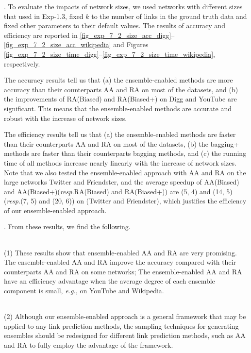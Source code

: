 \documentclass[10pt,journal,compsoc]{IEEEtran}
\newcommand{\stitle}[1]{\vspace{0.5ex}\noindent{\bf #1}}
\newcommand{\Aa}{{\sf AA}\xspace }
\newcommand{\RA}{{\sf RA}\xspace }
\newcommand{\Digg}{{\sf Digg}\xspace}
\newcommand{\YouTube}{{\sf YouTube}\xspace}
\newcommand{\Wikipedia}{{\sf Wikipedia}\xspace}
\newcommand{\Twitter}{{\sf Twitter}\xspace}
\newcommand{\Friendster}{{\sf Friendster}\xspace}
\newcommand{\AABiased}{{\sf AA(Biased)}\xspace}
\newcommand{\AABiasedp}{{\sf AA(Biased+)}\xspace}
\newcommand{\RABiased}{{\sf RA(Biased)}\xspace}
\newcommand{\RABiasedp}{{\sf RA(Biased+)}\xspace}
\newcommand{\eg}{\emph{e.g.,}\xspace}
\newcommand{\resp}{\emph{resp.}\xspace}
\newcommand{\sstab}{\rule{0pt}{8pt}\\[-2.4ex]}
\begin{document}
\stitle{Exp-7.2: Impacts of network sizes}. To evaluate the impacts of
network sizes, we used networks with different sizes that used in Exp-1.3,
fixed $k$ to the number of links in the ground truth data
and fixed other parameters to their default values.
The results of accuracy and  efficiency are reported in \ref{fig_exp_7_2_size_acc_digg}--\ref{fig_exp_7_2_size_acc_wikipedia}
and Figures \ref{fig_exp_7_2_size_time_digg}--\ref{fig_exp_7_2_size_time_wikipedia}, respectively.

The accuracy results tell us that (a) the ensemble-enabled methods are
more accuracy than their counterparts \Aa and \RA  on most of the datasets,
and (b) the improvements of \RABiased and \RABiasedp on \Digg and \YouTube are significant.
This means that the ensemble-enabled methods are accurate and robust
with the increase of network sizes.

The  efficiency  results tell us that (a) the ensemble-enabled methods are
faster than their counterparts \Aa and \RA  on most of the datasets,
(b) the bagging+ methods are faster than their counterparts bagging methods,
and (c) the running time of all methods increase nearly linearly with the
increase of network sizes. Note that we also tested the ensemble-enabled approach
with \Aa and \RA on the large networks \Twitter and \Friendster, and the average
speedup of \AABiased and \AABiasedp (\resp \RABiased and \RABiasedp)
are (5, 4) and (14, 5) (\resp (7, 5) and (20, 6)) on (\Twitter and \Friendster),
which justifies the efficiency of our ensemble-enabled approach.

\stitle{Remarks}. From these results, we find the following.

\sstab (1) These results show that  ensemble-enabled \Aa and \RA  are very promising. The ensemble-enabled \Aa and \RA improve the accuracy
compared with their counterparts \Aa and \RA on some networks; The ensemble-enabled \Aa and \RA have an efficiency
advantage when the average degree of each ensemble component is small,
\eg on \YouTube and \Wikipedia.

\sstab (2)
Although our ensemble-enabled approach is a general framework that may be applied to any link prediction
methods, the  sampling techniques for generating ensembles should be redesigned for different link prediction
methods, such as \Aa and \RA to fully employ the advantage of the framework.




\begin{footnotesize}


\end{footnotesize}
\end{document}
